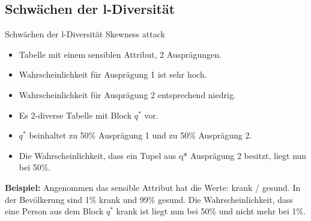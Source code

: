 \subsection{Schwächen der l-Diversität }

\begin{frame}{Schwächen der l-Diversität}
	\large \textcolor{gray!80}{Skewness attack} \normalsize \small\cite{Li2007t-closseness} 
	\begin{itemize}
		\item Tabelle mit einem sensiblen Attribut, 2 Ausprägungen.\\
	    \item Wahrscheinlichkeit für Ausprägung 1 ist sehr hoch.\\
	    \item Wahrscheinlichkeit für Ausprägung 2 entsprechend niedrig.\\
	    \item Es 2-diverse Tabelle mit Block $q^*$ vor.\\
	    \item $q^*$ beinhaltet zu 50\% Ausprägung 1 und zu 50\% Ausprägung 2.\\
	    \item Die Wahrscheinlichkeit, dass ein Tupel aus q* Ausprägung 2 besitzt, liegt nun bei 50\%.\\
	\end{itemize}
	
	\textbf{Beispiel:} Angenommen das sensible Attribut hat die Werte: krank / gesund. In der Bevölkerung sind 1\% krank und 99\% gesund. Die Wahrscheinlichkeit, dass eine Person aus dem Block $q^*$ krank ist liegt nun bei 50\% und nicht mehr bei 1\%.
\end{frame}

